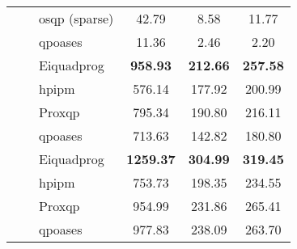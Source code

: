 \begin{table}[!htpb]
\begin{tabular}{@{}cclccc@{}}
&&\acrshort{osqp}  \scriptsize{(sparse)} & \num{42.79} & \num{8.58} & \num{11.77} \\
&&\acrshort{qpoases} & \num{11.36} & \num{2.46} & \num{2.20} \\
\midrule
\parbox[t]{1mm}{} & \parbox[t]{1mm}{} & Eiquadprog & \textbf{958.93} & \textbf{212.66} & \textbf{257.58}\\
&&\acrshort{hpipm} & 576.14 & 177.92 & 200.99\\
&&Proxqp & 795.34 & 190.80 & 216.11\\
&&\acrshort{qpoases} & 713.63 & 142.82 & 180.80\\
&\parbox[t]{1mm}{}  &Eiquadprog & \textbf{1259.37} & \textbf{304.99} & \textbf{319.45}\\
&& \acrshort{hpipm} & \num{753.73} & \num{198.35} & \num{234.55}\\
&& Proxqp & 954.99 & 231.86 & 265.41\\
&& \acrshort{qpoases} & 977.83 & 238.09 & 263.70\\
 \bottomrule
\end{tabular}
\end{table}



